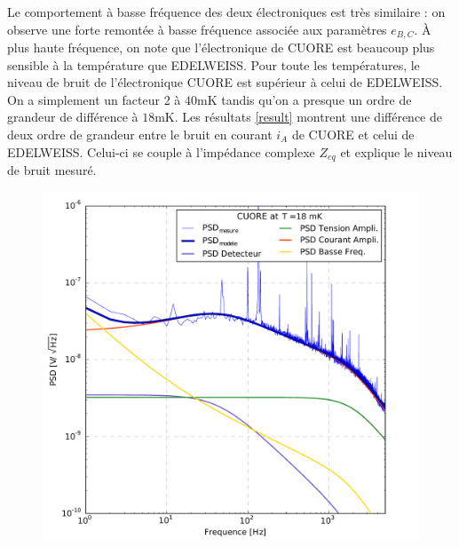 Le comportement à basse fréquence des deux électroniques est très similaire : on observe une forte remontée à basse fréquence associée aux paramètres $e_{B,C}$. À plus haute fréquence, on note que l'électronique de CUORE est beaucoup plus sensible à la température que EDELWEISS. Pour toute les températures, le niveau de bruit de l'électronique CUORE est supérieur à celui de EDELWEISS. On a simplement un facteur 2 à $40$mK tandis qu'on a presque un ordre de grandeur de différence à $18$mK. Les résultats \ref{result} montrent une différence de deux ordre de grandeur entre le bruit en courant $i_A$ de CUORE et celui de EDELWEISS. Celui-ci se couple à l'impédance complexe $Z_{eq}$ et explique le niveau de bruit mesuré.

\begin{figure}[!ht]
\begin{minipage}{0.49\textwidth}
\includegraphics[width=\textwidth]{Images/cuore_18.pdf}
\end{minipage}
\hfill
\begin{minipage}{0.49\textwidth}

\end{minipage}
\end{figure}
